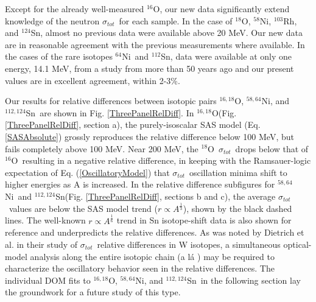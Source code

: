 \documentclass[twocolumn,secnumarabic,amssymb, nobibnotes, aps, prl,
superscriptaddress, nobalancelastpage]{revtex4}
\newcommand{\tot}{\ensuremath{\sigma_{tot}}}
\newcommand{\oSix}{\ensuremath{^{16}}O}
\newcommand{\oEight}{\ensuremath{^{18}}O}
\newcommand{\oSixEight}{\ensuremath{^{16,18}}O}
\newcommand{\niEight}{\ensuremath{^{58}}N\lowercase{i}}
\newcommand{\niFour}{\ensuremath{^{64}}N\lowercase{i}}
\newcommand{\niEightFour}{\ensuremath{^{58,64}}N\lowercase{i}}
\newcommand{\rhThree}{\ensuremath{^{103}}R\lowercase{h}}
\newcommand{\snTwelve}{\ensuremath{^{112}}S\lowercase{n}}
\newcommand{\snFour}{\ensuremath{^{124}}S\lowercase{n}}
\newcommand{\snTwelveFour}{\ensuremath{^{112,124}}S\lowercase{n}}
\begin{document}
Except for the already well-measured \oSix, our new data significantly
extend knowledge of the neutron \tot\ for each sample. In the case of \oEight,
\niEight, \rhThree, and \snFour, almost no previous data were available
above 20 MeV. Our new data are in reasonable agreement with the previous
measurements where available. In the cases of the rare isotopes \niFour\ and \snTwelve,
data were available at only one energy, 14.1 MeV, from a study from more than 50
years ago \cite{Dukarevich1967} and our present values are in excellent agreement, within 2-3\%.

Our results for relative differences between isotopic pairs \oSixEight,
\niEightFour, and \snTwelveFour\ are shown in Fig. \ref{ThreePanelRelDiff}. In
\oSixEight (Fig. \ref{ThreePanelRelDiff}, section a), the purely-isoscalar
SAS model (Eq.  \ref{SASAbsolute}) grossly reproduces the relative
difference below 100 MeV, but fails completely above 100 MeV. Near 200
MeV, the \oEight\ \tot\ drops below that of \oSix\ resulting in a negative
relative difference, in keeping with the Ramsauer-logic expectation of Eq.
(\ref{OscillatoryModel}) that \tot\ oscillation minima shift to higher
energies as A is increased. In the relative difference subfigures for 
\niEightFour\ and \snTwelveFour (Fig. \ref{ThreePanelRelDiff}, sections b and c),
the average \tot\ values are below the
SAS model trend ($r \propto A^{\frac{1}{3}}$), shown by the black dashed lines. 
The well-known $r \propto A^{\frac{1}{6}}$ trend in Sn isotope-shift data 
\cite{Anselment1986} is also shown for reference and
underpredicts the relative differences. As was noted by Dietrich et al. in
their study of \tot\ relative differences in W isotopes, a simultaneous optical-model
analysis along the entire isotopic chain (a l\'a \cite{Mueller2011})
may be required to characterize the oscillatory behavior seen in the relative differences.
The individual DOM fits to \oSixEight, \niEightFour, and
\snTwelveFour\ in the following section lay the groundwork for a future study of
this type.
\end{document}
